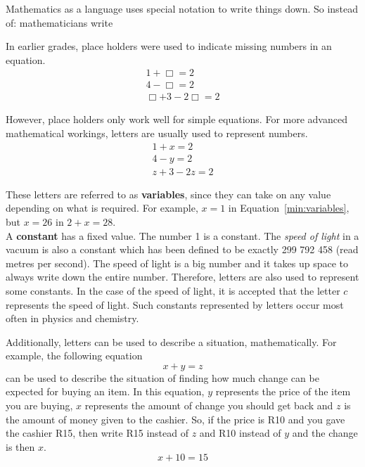 \documentclass[10pt,a4paper,titlepage,twoside,openright]{report}
\begin{document}
Mathematics as a language uses special notation to write things down. So instead of:
mathematicians write

In earlier grades, place holders were used to indicate missing numbers in an equation.
\begin{eqnarray*}
1+\Box=2\\
4-\Box=2\\
\Box+3-2\Box=2
\end{eqnarray*}

However, place holders only work well for simple equations. For more advanced mathematical workings, letters are usually used to represent numbers. 
\begin{eqnarray*}
\label{min:variables}
1+x=2\\
4-y=2\\
z+3-2z=2
\end{eqnarray*}

These letters are referred to as \textbf{variables}, since they can take on any value depending on what is required. For example, $x=1$ in Equation~\ref{min:variables}, but $x=26$ in $2+x=28$.
\\
A \textbf{constant} has a fixed value. The number 1 is a constant. The \textit{speed of light} in a vacuum is also a constant which has been defined to be exactly 299 792 458 \ms (read metres per second). The speed of light is a big number and it takes up space to always write down the entire number. Therefore, letters are also used to represent some constants. In the case of the speed of light, it is accepted that the letter $c$ represents the speed of light. Such constants represented by letters occur most often in physics and chemistry.

Additionally, letters can be used to describe a situation, mathematically. For example, the following equation
\begin{equation}
\label{eq:mfoundation:alg:ex1}
x+y=z
\end{equation}
can be used to describe the situation of finding how much change can be expected for buying an item. In this equation, $y$ represents the price of the item you are buying, $x$ represents the amount of change you should get back and $z$ is the amount of money given to the cashier. So, if the price is R10 and you gave the cashier R15, then write R15 instead of $z$ and R10 instead of $y$ and the change is then $x$.
\begin{equation}
x+10=15
\end{equation}
\end{document}
